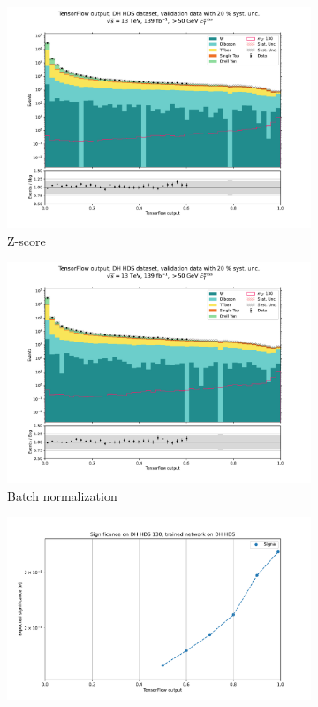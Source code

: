 \documentclass[12pt, a4paper]{book}
\begin{document}
\begin{figure}[!ht]
	\centering
	\begin{subfigure}[b]{0.49\textwidth}
      \centering
      \includegraphics[width=1\textwidth]{Z_score/VAL.pdf}
      \caption{Z-score}
   \end{subfigure}
   \hfill
   \begin{subfigure}[b]{0.49\textwidth}
      \centering
      \includegraphics[width=1\textwidth]{BatchNorm/VAL.pdf}
      \caption{Batch normalization}
   \end{subfigure}
   \hfill
   \begin{subfigure}[b]{0.49\textwidth}
      \centering
      \includegraphics[width=1\textwidth]{Z_score/EXP_SIG.pdf}

\end{subfigure}
\end{figure}
\end{document}
